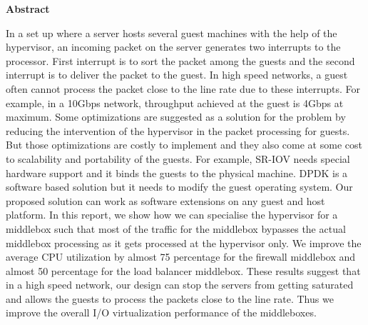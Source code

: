 \documentclass[a4paper,11pt]{report}
\begin{document}
\vspace*{2cm}
{\center \textbf {Abstract}\\}
\vspace{1cm}

\noindent In a set up where a server hosts several guest machines with the help of the hypervisor, an incoming packet on the server generates two interrupts to the processor. First interrupt is to sort the packet among the guests and the second interrupt is to deliver the packet to the guest. In high speed networks, a guest often cannot process the packet close to the line rate due to these interrupts. For example, in a 10Gbps network, throughput achieved at the guest is 4Gbps at maximum. Some optimizations are suggested as a solution for the problem by reducing the intervention of the hypervisor in the packet processing for guests. But those optimizations are costly to implement and they also come at some cost to scalability and portability of the guests. For example, SR-IOV\cite{5416637} needs special hardware support and it binds the guests to the physical machine. DPDK\cite{DPD} is a software based solution but it needs to modify the guest operating system. Our proposed solution can work as software extensions on any guest and host platform. In this report, we show how we can specialise the hypervisor for a middlebox such that most of the traffic for the middlebox bypasses the actual middlebox processing as it gets processed at the hypervisor only. We improve the average CPU utilization by almost 75 percentage for the firewall middlebox and almost 50 percentage for the load balancer middlebox. These results suggest that in a high speed network, our design can stop the servers from getting saturated and allows the guests to process the packets close to the line rate. Thus we improve the overall I/O virtualization performance of the middleboxes.             
\end{document}
